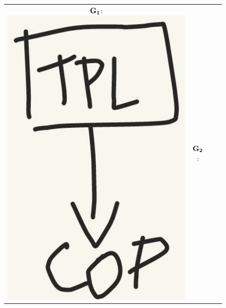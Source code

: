 \begin{figure}[t]
  \centering
  \begin{tabular}[h]{cccl}
    \figtabsize
    ${\bf G_1}$: 
    \includegraphics[scale=0.2]{../img/ex1_concaveroundgr.pdf} &
    ${\bf G_2}$: 

\end{tabular}
\end{figure}
